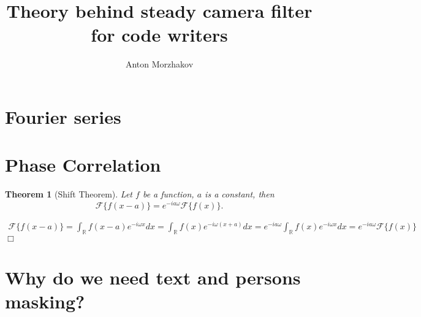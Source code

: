 \documentclass[9pt]{article}
\newtheorem{theorem}{Theorem}[section]
\newtheorem{proof}{Proof}
\renewenvironment{proof}{{\bf \emph{Proof.} }}{\hfill $\Box$ \\}
\numberwithin{equation}{section}
\begin{document}
\title{\sc Theory behind steady camera filter for code writers}
\author{Anton Morzhakov}
\maketitle

\section{Fourier series}\label{sec:theory-behind-fourier-series}



\section{Phase Correlation}\label{sec:theory-behind-phase-correlation}

        \begin{theorem}[Shift Theorem] \label{shift_theorem}
            Let \(f\) be a function, $a$ is a constant, then
            \[
                \mathcal F \{ f(x - a) \} =  e^{-i a \omega} \mathcal F \{ f(x) \}.
            \]
        \end{theorem}

        \begin{proof}
            \begin{multline}
                \mathcal F \{ f(x - a) \}  =  \int_{\mathbb R} f(x - a) e^{-i \omega x} dx =
                \int_{\mathbb R} f(x) e^{-i \omega (x + a)} dx = \allowbreak
                e^{-i a \omega} \int_{\mathbb R} f(x) e^{-i \omega x} dx = e^{-i a \omega} \mathcal F \{ f(x) \}
            \end{multline}
        \end{proof}

\section{Why do we need text and persons masking?}\label{sec:why-we-need-text-and-persond-masking?}
\end{document}
